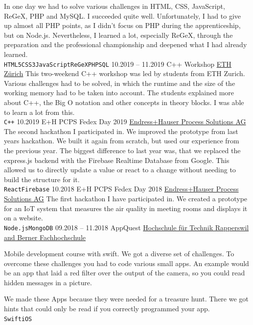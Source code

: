 \documentclass[9pt]{developercv} %
\begin{document}
\begin{entrylist}
{    In one day we had to solve various challenges in HTML, CSS, JavaScript, ReGeX, PHP and MySQL. I succeeded quite well. Unfortunately, I had to give up almost all PHP points, as I didn't focus on PHP during the apprenticeship, but on Node.js.
    Nevertheless, I learned a lot, especially ReGeX, through the preparation and the professional championship and deepened what I had already learned.\\ \texttt{HTML5}\slashsep\texttt{CSS3}\slashsep\texttt{JavaScript}\slashsep\texttt{ReGeX}\slashsep\texttt{PHP}\slashsep\texttt{SQL}}
	\entry
		{10.2019 -- 11.2019}
		{C++ Workshop}
		{\href{https://ethz.ch/}{ETH Zürich}}
		{This two-weekend C++ workshop was led by students from ETH Zurich. Various challenges had to be solved, in which the runtime and the size of the working memory had to be taken into account. The students explained more about C++, the Big O notation and other concepts in theory blocks.
    I was able to learn a lot from this.\\ \texttt{C++}}
	\entry
		{10.2019}
		{E+H PCPS Fedex Day 2019}
		{\href{https://endress.com}{Endress+Hauser Process Solutions AG}}
		{The second hackathon I participated in. We improved the prototype from last years hackathon. We built it again from scratch, but used our experience from the previous year. The biggest difference to last year was, that we replaced the express.js backend with the Firebase Realtime Database from Google. This allowed us to directly update a value or react to a change without needing to build the structure for it.\\ \texttt{React}\slashsep\texttt{Firebase}}
	\entry
		{10.2018}
		{E+H PCPS Fedex Day 2018}
		{\href{https://endress.com}{Endress+Hauser Process Solutions AG}}
		{The first hackathon I have participated in. We created a prototype for an IoT system that measures the air quality in meeting rooms and displays it on a website.\\ \texttt{Node.js}\slashsep\texttt{MongoDB}}
	\entry
		{09.2018 -- 11.2018}
		{AppQuest}
		{\href{https://appquest.ch/}{Hochschule für Technik Rapperswil and Berner Fachhochschule}}
		{Mobile development course with swift. We got a diverse set of challenges. To overcome these challenges you had to code various small apps. An example would be an app that laid a red filter over the output of the camera, so you could read hidden messages in a picture.

    We made these Apps because they were needed for a treasure hunt. There we got hints that could only be read if you correctly programmed your app.\\ \texttt{Swift}\slashsep\texttt{iOS}}
\end{entrylist}
\end{document}
